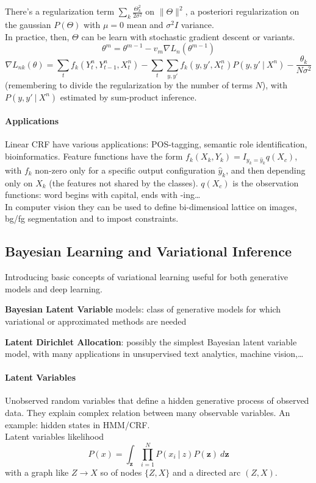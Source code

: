 \documentclass[10pt]{report}
\begin{document}
There's a regularization term $\sum_k\frac{\Theta_k^2}{2\sigma^2}$ on $\|\Theta\|^2$, a posteriori regularization on the gaussian $P(\Theta)$ with $\mu=0$ mean and $\sigma^2I$ variance.\\
In practice, then, $\Theta$ can be learn with stochastic gradient descent or variants.
$$\theta^m = \theta^{m-1} - v_m\nabla L_n(\theta^{m-1})$$
$$\nabla L_{nk}(\theta) = \sum_t f_k(Y_t^n,Y_{t-1}^n,X_t^n)-\sum_t\sum_{y,y'}f_k(y,y',X_t^n)P(y,y'\:|\:X^n)-\frac{\theta_k}{N\sigma^2}$$
(remembering to divide the regularization by the number of terms $N$), with$P(y,y'\:|\:X^n)$ estimated by sum-product inference.
\paragraph{Applications} Linear CRF have various applications: POS-tagging, semantic role identification, bioinformatics. Feature functions have the form $f_k(X_k,Y_k)=I_{y_k=\hat{y}_k}q(X_c)$, with $f_k$ non-zero only for a specific output configuration $\hat{y}_k$, and then depending only on $X_k$ (the features not shared by the classes). $q(X_c)$ is the observation functions: word begins with capital, ends with -ing\ldots\\
In computer vision they can be used to define bi-dimensioal lattice on images, bg/fg segmentation and to impost constraints.
\subsection{Bayesian Learning and Variational Inference}
Introducing basic concepts of variational learning useful for both generative models and deep learning.
\begin{list}{}{}
	\item \textbf{Bayesian Latent Variable} models: class of generative models for which variational or approximated methods are needed
	\item \textbf{Latent Dirichlet Allocation}: possibly the simplest Bayesian latent variable model, with many applications in unsupervised text analytics, machine vision,\ldots
\end{list}
\paragraph{Latent Variables} Unobserved random variables that define a hidden generative process of observed data. They explain complex relation between many observable variables. An example: hidden states in HMM/CRF.\\
Latent variables likelihood $$P(x) = \int_\mathbf{z} \prod_{i=1}^N P(x_i\:|\:z)P(\mathbf{z})\:d\mathbf{z}$$ with a graph like $Z \longrightarrow X$ so of nodes $\{Z,X\}$ and a directed arc $(Z,X)$.
\end{document}
